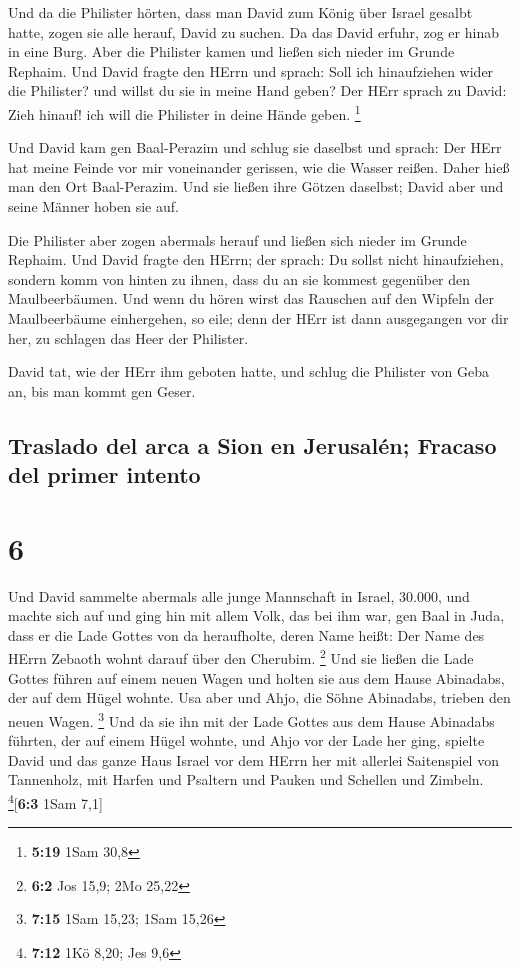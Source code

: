  Und da die Philister hörten, dass man David zum König
über Israel gesalbt hatte, zogen sie alle herauf, David zu suchen. Da
das David erfuhr, zog er hinab in eine Burg.  Aber die
Philister kamen und ließen sich nieder im Grunde Rephaim.
 Und David fragte den HErrn und sprach: Soll ich
hinaufziehen wider die Philister? und willst du sie in meine Hand geben?
Der HErr sprach zu David: Zieh hinauf! ich will die Philister in deine
Hände geben. \footnote{\textbf{5:19} 1Sam 30,8}

 Und David kam gen Baal-Perazim und schlug sie daselbst
und sprach: Der HErr hat meine Feinde vor mir voneinander gerissen, wie
die Wasser reißen. Daher hieß man den Ort Baal-Perazim. 
Und sie ließen ihre Götzen daselbst; David aber und seine Männer hoben
sie auf.

 Die Philister aber zogen abermals herauf und ließen sich
nieder im Grunde Rephaim.  Und David fragte den HErrn;
der sprach: Du sollst nicht hinaufziehen, sondern komm von hinten zu
ihnen, dass du an sie kommest gegenüber den Maulbeerbäumen.
 Und wenn du hören wirst das Rauschen auf den Wipfeln der
Maulbeerbäume einhergehen, so eile; denn der HErr ist dann ausgegangen
vor dir her, zu schlagen das Heer der Philister.

 David tat, wie der HErr ihm geboten hatte, und schlug
die Philister von Geba an, bis man kommt gen Geser.

\hypertarget{traslado-del-arca-a-sion-en-jerusaluxe9n-fracaso-del-primer-intento}{%
\subsection{Traslado del arca a Sion en Jerusalén; Fracaso del primer
intento}\label{traslado-del-arca-a-sion-en-jerusaluxe9n-fracaso-del-primer-intento}}

\hypertarget{section-5}{%
\section{6}\label{section-5}}

 Und David sammelte abermals alle junge Mannschaft in
Israel, 30.000,  und machte sich auf und ging hin mit
allem Volk, das bei ihm war, gen Baal in Juda, dass er die Lade Gottes
von da heraufholte, deren Name heißt: Der Name des HErrn Zebaoth wohnt
darauf über den Cherubim. \footnote{\textbf{6:2} Jos 15,9; 2Mo 25,22}
 Und sie ließen die Lade Gottes führen auf einem neuen
Wagen und holten sie aus dem Hause Abinadabs, der auf dem Hügel wohnte.
Usa aber und Ahjo, die Söhne Abinadabs, trieben den neuen Wagen.
\footnote{\textbf{7:15} 1Sam 15,23; 1Sam 15,26}  Und da
sie ihn mit der Lade Gottes aus dem Hause Abinadabs führten, der auf
einem Hügel wohnte, und Ahjo vor der Lade her ging, 
spielte David und das ganze Haus Israel vor dem HErrn her mit allerlei
Saitenspiel von Tannenholz, mit Harfen und Psaltern und Pauken und
Schellen und Zimbeln. \footnote{\textbf{7:12} 1Kö 8,20; Jes 9,6}{[}\textbf{6:3}
1Sam 7,1{]}

